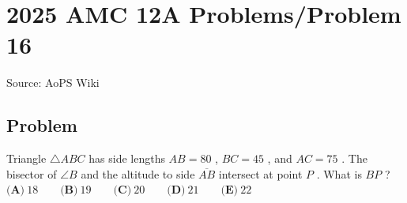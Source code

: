 \documentclass[12pt]{article}
\begin{document}
\section*{{2025 AMC 12A Problems/Problem 16}}
Source: AoPS Wiki

\subsection*{Problem}
Triangle $\triangle ABC$ has side lengths $AB = 80$ , $BC = 45$ , and $AC = 75$ . The bisector of $\angle B$ and the altitude to side $\overline{AB}$ intersect at point $P$ . What is $BP$ ? $\textbf{(A)}~18\qquad\textbf{(B)}~19\qquad\textbf{(C)}~20\qquad\textbf{(D)}~21\qquad\textbf{(E)}~22$
\end{document}
